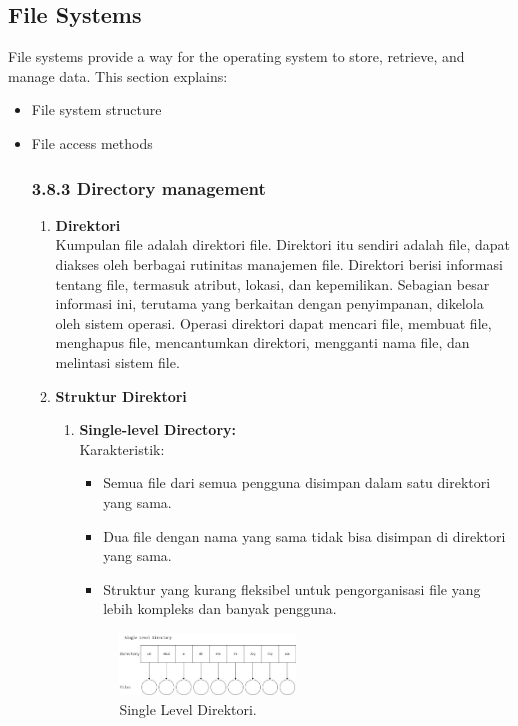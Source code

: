 \documentclass[12pt]{article}
\begin{document}
\subsection{File Systems}
File systems provide a way for the operating system to store, retrieve, and manage data. This section explains:
\begin{itemize}
    \item File system structure
    \item File access methods
    \subsubsection*{3.8.3 Directory management}
    
    \begin{enumerate}
    \item \textbf{Direktori} \\
    Kumpulan file adalah direktori file. Direktori itu sendiri adalah file, dapat diakses oleh berbagai rutinitas manajemen file. Direktori berisi informasi tentang file, termasuk atribut, lokasi, dan kepemilikan. Sebagian besar informasi ini, terutama yang berkaitan dengan penyimpanan, dikelola oleh sistem operasi. Operasi direktori dapat mencari file, membuat file, menghapus file, mencantumkan direktori, mengganti nama file, dan melintasi sistem file.

    \item \textbf{Struktur Direktori}
    \begin{enumerate}[label=\alph*.]
        \item \textbf{Single-level Directory:} \\
        Karakteristik:
        \begin{itemize}
            \item Semua file dari semua pengguna disimpan dalam satu direktori yang sama.
            \item Dua file dengan nama yang sama tidak bisa disimpan di direktori yang sama.
            \item Struktur yang kurang fleksibel untuk pengorganisasi file yang lebih kompleks dan banyak pengguna.
        \end{itemize}
        
    \begin{figure}[h]
    \centering
    \includegraphics[width=0.5\textwidth]{asset/gambar1.jpg}
    \caption{Single Level Direktori.}
    \label{fig:single-level-direktori}
    \end{figure}


\end{enumerate}
\end{enumerate}
\end{itemize}
\end{document}
